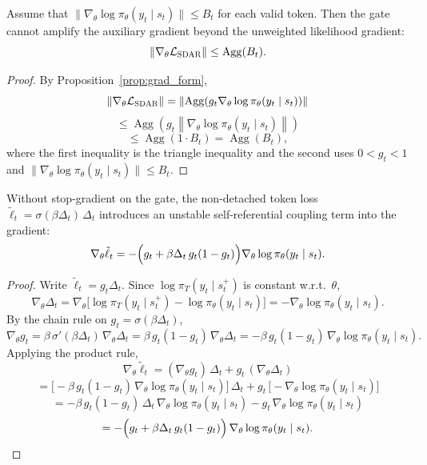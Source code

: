 \begin{proposition}
\label{prop:bounded_grad}
Assume that $\|\nabla_{\theta}\log \pi_{\theta}(y_t \mid s_t)\| \le B_t$ for each valid token.
Then the gate cannot amplify the auxiliary gradient beyond the unweighted likelihood gradient:
\[
\left\| \nabla_{\theta}\mathcal{L}_{\textsc{SDAR}} \right\|
\le \operatorname{Agg}(B_t).
\]
\end{proposition}

\begin{proof}
By Proposition~\ref{prop:grad_form},
\[
\left\| \nabla_{\theta}\mathcal{L}_{\textsc{SDAR}} \right\|
= \left\| \operatorname{Agg}\!\left( g_t \nabla_{\theta}\log \pi_{\theta}(y_t \mid s_t) \right) \right\|
\]
\[
\le \operatorname{Agg}\!\left( g_t \left\| \nabla_{\theta}\log \pi_{\theta}(y_t \mid s_t) \right\| \right)
\]
\[
\le \operatorname{Agg}\!\left( 1 \cdot B_t \right)
= \operatorname{Agg}(B_t),
\]
where the first inequality is the triangle inequality and the second uses $0 < g_t < 1$ and $\|\nabla_{\theta}\log \pi_{\theta}(y_t \mid s_t)\| \le B_t$.
\end{proof}

\begin{proposition}
\label{prop:detach}
Without stop-gradient on the gate,
the non-detached token loss $\tilde{\ell}_t = \sigma(\beta \Delta_t)\,\Delta_t$
introduces an unstable self-referential coupling term into the gradient:
\[
\nabla_{\theta}\tilde{\ell}_t
= - \Bigl( g_t + \beta \Delta_t\, g_t(1-g_t) \Bigr)
\nabla_{\theta}\log \pi_{\theta}(y_t \mid s_t).
\]
\end{proposition}

\begin{proof}
Write $\tilde{\ell}_t = g_t \Delta_t$. Since $\log \pi_T(y_t \mid s_t^{+})$ is constant w.r.t.\ $\theta$,
\[
\nabla_{\theta}\Delta_t
= \nabla_{\theta}\bigl[\log \pi_T(y_t \mid s_t^{+}) - \log \pi_{\theta}(y_t \mid s_t)\bigr]
= -\nabla_{\theta}\log \pi_{\theta}(y_t \mid s_t).
\]
By the chain rule on $g_t = \sigma(\beta \Delta_t)$,
\[
\nabla_{\theta}g_t
= \beta\, \sigma'(\beta \Delta_t)\,\nabla_{\theta}\Delta_t
= \beta\, g_t(1-g_t)\,\nabla_{\theta}\Delta_t
= -\beta\, g_t(1-g_t)\,\nabla_{\theta}\log \pi_{\theta}(y_t \mid s_t).
\]
Applying the product rule,
\[
\nabla_{\theta}\tilde{\ell}_t
= (\nabla_{\theta}g_t)\,\Delta_t + g_t\,(\nabla_{\theta}\Delta_t)
\]
\[
= \bigl[-\beta\, g_t(1-g_t)\,\nabla_{\theta}\log \pi_{\theta}(y_t \mid s_t)\bigr]\,\Delta_t
  + g_t\,\bigl[-\nabla_{\theta}\log \pi_{\theta}(y_t \mid s_t)\bigr]
\]
\[
= -\beta\, g_t(1-g_t)\,\Delta_t\,\nabla_{\theta}\log \pi_{\theta}(y_t \mid s_t)
   - g_t\,\nabla_{\theta}\log \pi_{\theta}(y_t \mid s_t)
\]
\[
= -\Bigl( g_t + \beta \Delta_t\, g_t(1-g_t) \Bigr)\,
   \nabla_{\theta}\log \pi_{\theta}(y_t \mid s_t).
\]
\end{proof}
